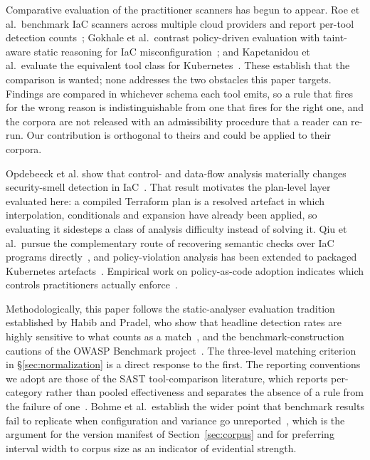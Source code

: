 \documentclass[journal]{IEEEtran}
\begin{document}
Comparative evaluation of the practitioner scanners has begun to appear.
Roe et al.\ benchmark IaC scanners across multiple cloud providers and report
per-tool detection counts~\cite{roe2026multicloud}; Gokhale et al.\ contrast
policy-driven evaluation with taint-aware static reasoning for IaC
misconfiguration~\cite{gokhale2026comparative}; and Kapetanidou et al.\ evaluate
the equivalent tool class for Kubernetes~\cite{kapetanidou2025k8s}. These
establish that the comparison is wanted; none addresses the two obstacles this
paper targets. Findings are compared in whichever schema each tool emits, so a
rule that fires for the wrong reason is indistinguishable from one that fires for
the right one, and the corpora are not released with an admissibility procedure
that a reader can re-run. Our contribution is orthogonal to theirs and could be
applied to their corpora.

Opdebeeck et al. show that control- and data-flow analysis materially changes
security-smell detection in IaC~\cite{opdebeeck2023control, opdebeeck2022smelly}.
That result motivates the plan-level layer evaluated here: a compiled Terraform
plan is a resolved artefact in which interpolation, conditionals and expansion
have already been applied, so evaluating it sidesteps a class of analysis
difficulty instead of solving it. Qiu et al.\ pursue the complementary route of
recovering semantic checks over IaC programs
directly~\cite{qiu2024semantic}, and policy-violation analysis has been extended
to packaged Kubernetes artefacts~\cite{minna2025helm}. Empirical work on
policy-as-code adoption indicates which controls practitioners actually
enforce~\cite{foalem2026pac}.

Methodologically, this paper follows the static-analyser evaluation tradition
established by Habib and Pradel, who show that headline detection rates are
highly sensitive to what counts as a match~\cite{habib2018howmany}, and the
benchmark-construction cautions of the OWASP Benchmark
project~\cite{owasp2023benchmark}. The three-level matching criterion in
\S\ref{sec:normalization} is a direct response to the first. The reporting
conventions we adopt are those of the SAST tool-comparison literature, which
reports per-category rather than pooled effectiveness and separates the absence of
a rule from the failure of one~\cite{li2023sast, esposito2024extensive}. Bohme
et al.\ establish the wider point that benchmark results fail to replicate when
configuration and variance go unreported~\cite{bohme2022reliability}, which is the
argument for the version manifest of Section~\ref{sec:corpus} and for preferring
interval width to corpus size as an indicator of evidential strength.
\end{document}
